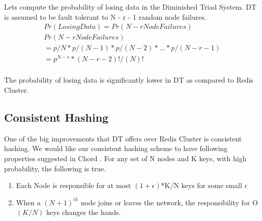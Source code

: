 \documentclass[10pt,twocolumn,letterpaper]{article}
\begin{document}
Lets compute the probability of losing data in the Diminished Triad System. DT is assumed to be fault tolerant to N - r - 1 random node failures.
\begin{equation}
\label{xx}
\begin{split}
Pr(Losing Data) = Pr(N - r  Node Failures)\\
Pr(N - r  Node Failures) \\
= p/N * p/(N-1) * p/(N-2) * ... * p/(N-r-1)\\
=p^{N-r}*(N-r-2)!/(N)!\\
\end{split}
\end{equation}

The probability of losing data is significantly lower in DT as compared to Redis Cluster.

\subsection{Consistent Hashing}
One of the big improvements that DT offers over Redis Cluster is consistent hashing. We would like our consistent hashing scheme to have following properties suggested in Chord \cite{chord}.
For any set of N nodes and K keys, with high probability, the following is true.
\begin{enumerate}
\item Each Node is responsible for at most \((1+ \epsilon )\)*K/N keys for some small  \( \epsilon  \)
\item When a \((N+1)^{th}\) node joins or leaves the network, the responsibility for O\((K/N)\) keys changes the hands. 
\end{enumerate}
\end{document}
